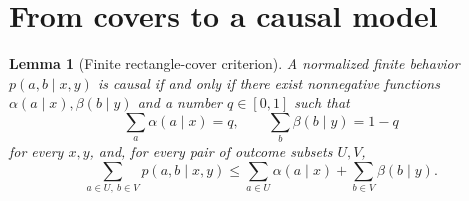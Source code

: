 \documentclass[11pt,letterpaper]{article}
\newtheorem{lemma}[theorem]{Lemma}
\theoremstyle{remark}\newtheorem{remark}[theorem]{Remark}
\begin{document}
\section{From covers to a causal model}\label{sec:flow}

\begin{lemma}[Finite rectangle-cover criterion]\label{lem:flow}
A normalized finite behavior $p(a,b\mid x,y)$ is causal if and only if there exist nonnegative functions $\alpha(a\mid x),\beta(b\mid y)$ and a number $q\in[0,1]$ such that
\[
 \sum_a\alpha(a\mid x)=q,\qquad
 \sum_b\beta(b\mid y)=1-q
\]
for every $x,y$, and, for every pair of outcome subsets $U,V$,
\begin{equation}\label{eq:covercriterion}
 \sum_{a\in U,\ b\in V}p(a,b\mid x,y)
 \le\sum_{a\in U}\alpha(a\mid x)+\sum_{b\in V}\beta(b\mid y).
\end{equation}
\end{lemma}
\end{document}
